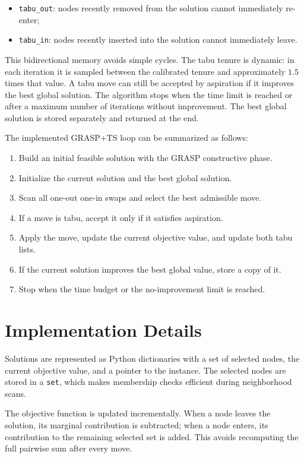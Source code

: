 \documentclass[12pt,a4paper]{article}
\newcommand{\graspTS}{GRASP+TS}
\begin{document}
\begin{itemize}
    \item \texttt{tabu\_out}: nodes recently removed from the solution cannot immediately re-enter;
    \item \texttt{tabu\_in}: nodes recently inserted into the solution cannot immediately leave.
\end{itemize}

This bidirectional memory avoids simple cycles. The tabu tenure is dynamic: in each iteration it is sampled between the calibrated tenure and approximately \(1.5\) times that value. A tabu move can still be accepted by aspiration if it improves the best global solution. The algorithm stops when the time limit is reached or after a maximum number of iterations without improvement. The best global solution is stored separately and returned at the end.

The implemented \graspTS{} loop can be summarized as follows:

\begin{enumerate}
    \item Build an initial feasible solution with the GRASP constructive phase.
    \item Initialize the current solution and the best global solution.
    \item Scan all one-out one-in swaps and select the best admissible move.
    \item If a move is tabu, accept it only if it satisfies aspiration.
    \item Apply the move, update the current objective value, and update both tabu lists.
    \item If the current solution improves the best global value, store a copy of it.
    \item Stop when the time budget or the no-improvement limit is reached.
\end{enumerate}

\section{Implementation Details}

Solutions are represented as Python dictionaries with a set of selected nodes, the current objective value, and a pointer to the instance. The selected nodes are stored in a \texttt{set}, which makes membership checks efficient during neighborhood scans.

The objective function is updated incrementally. When a node leaves the solution, its marginal contribution is subtracted; when a node enters, its contribution to the remaining selected set is added. This avoids recomputing the full pairwise sum after every move.
\end{document}
